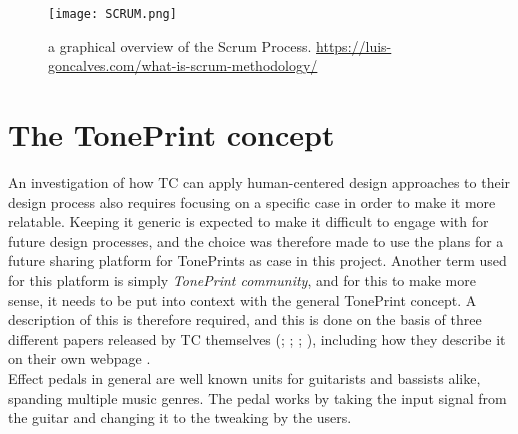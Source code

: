 \begin{figure}[H]
	\centering
	\texttt{[image: SCRUM.png]}
	\caption{a graphical overview of the Scrum Process. \url{https://luis-goncalves.com/what-is-scrum-methodology/}}
	\label{fig:ScrumExplanation}
\end{figure}


\section{The TonePrint concept}
\label{TonePrintConceptDefined}
An investigation of how TC can apply human-centered design approaches to their design process also requires focusing on a specific case in order to make it more relatable. Keeping it generic is expected to make it difficult to engage with for future design processes, and the choice was therefore made to use the plans for a future sharing platform for TonePrints as case in this project. Another term used for this platform is simply \textit{TonePrint community}, and for this to make more sense, it needs to be put into context with the general TonePrint concept. A description of this is therefore required, and this is done on the basis of three different papers released by TC themselves (\citeauthor{PDF:TonePrintAnalyse}; \citeyear{PDF:TonePrintAnalyse}; \citeyear{PDF:DesignforloebAfUserTonePrint}; \citeyear{PDF:BrugerWorkshopUserTonePrints}), including how they describe it on their own webpage \parencite{WEB:AboutTonePrints}. \\



\noindent
Effect pedals in general are well known units for guitarists and bassists alike, spanding multiple music genres. The pedal works by taking the input signal from the guitar and changing it to the tweaking by the users.

